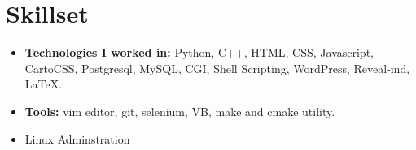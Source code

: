 \documentclass[11pt,a4paper,sans]{moderncv}        %
\begin{document}
\section{Skillset}

\vspace{6pt}
 
\begin{itemize}



\item \textbf{Technologies I worked in:} Python, C++, HTML, CSS, Javascript, CartoCSS, Postgresql, MySQL, CGI, Shell Scripting, WordPress, Reveal-md, LaTeX.

\item \textbf{Tools:} vim editor, git, selenium, VB, make and cmake utility.

\item Linux Adminstration
\end{itemize}



\nocite{*}



\end{document}
